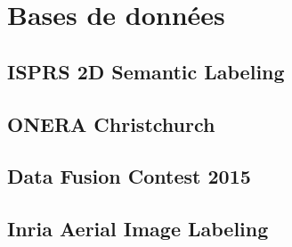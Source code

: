 \section{Bases de données}

\subsection{ISPRS 2D Semantic Labeling}

\subsection{ONERA Christchurch}

\subsection{Data Fusion Contest 2015}

\subsection{Inria Aerial Image Labeling}
	


